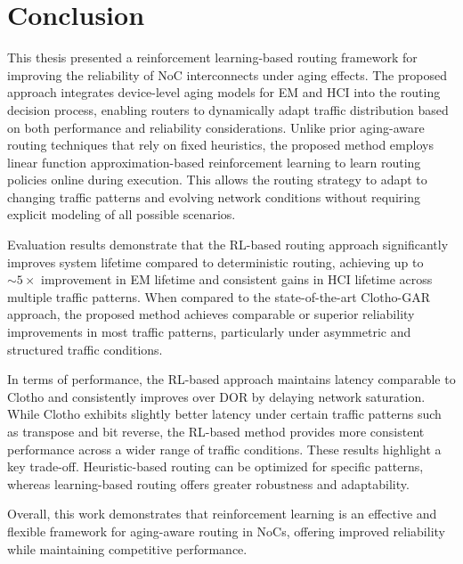 \chapter{Conclusion}

This thesis presented a reinforcement learning-based routing framework for improving the reliability of NoC interconnects under aging effects. The proposed approach integrates device-level aging models for EM and HCI into the routing decision process, enabling routers to dynamically adapt traffic distribution based on both performance and reliability considerations. Unlike prior aging-aware routing techniques that rely on fixed heuristics, the proposed method employs linear function approximation-based reinforcement learning to learn routing policies online during execution. This allows the routing strategy to adapt to changing traffic patterns and evolving network conditions without requiring explicit modeling of all possible scenarios.

Evaluation results demonstrate that the RL-based routing approach significantly improves system lifetime compared to deterministic routing, achieving up to $\sim5\times$ improvement in EM lifetime and consistent gains in HCI lifetime across multiple traffic patterns. When compared to the state-of-the-art Clotho-GAR approach, the proposed method achieves comparable or superior reliability improvements in most traffic patterns, particularly under asymmetric and structured traffic conditions.

In terms of performance, the RL-based approach maintains latency comparable to Clotho and consistently improves over DOR by delaying network saturation. While Clotho exhibits slightly better latency under certain traffic patterns such as transpose and bit reverse, the RL-based method provides more consistent performance across a wider range of traffic conditions. These results highlight a key trade-off. Heuristic-based routing can be optimized for specific patterns, whereas learning-based routing offers greater robustness and adaptability.

Overall, this work demonstrates that reinforcement learning is an effective and flexible framework for aging-aware routing in NoCs, offering improved reliability while maintaining competitive performance.
